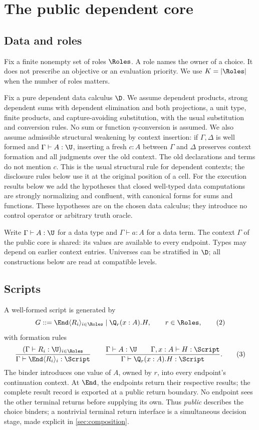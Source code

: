 \section{The public dependent core}
\label{sec:core}

\subsection{Data and roles}

Fix a finite nonempty set of roles $\Roles$. A role names the owner of a
choice. It does not prescribe an objective or an evaluation priority. We use
$K=|\Roles|$ when the number of roles matters.

Fix a pure dependent data calculus $\D$. We assume dependent products, strong
dependent sums with dependent elimination and both projections, a unit type,
finite products, and capture-avoiding substitution, with the usual
substitution and conversion rules. No sum or function $\eta$-conversion is
assumed. We also assume admissible structural weakening by context insertion:
if $\Gamma,\Delta$ is well formed and $\Gamma\vdash A:\U$, inserting a
fresh $c:A$ between $\Gamma$ and $\Delta$ preserves context formation and
all judgments over the old context. The old declarations and terms do not
mention $c$. This is the usual structural rule for dependent contexts;
the disclosure rules below use it at the original position of a cell.
For the execution results below we
add the hypotheses that closed well-typed data computations are strongly
normalizing and confluent, with canonical forms for sums and functions.
These hypotheses are on the chosen data calculus; they introduce no control
operator or arbitrary truth oracle.

Write $\Gamma\vdash A:\U$ for a data type and $\Gamma\vdash a:A$ for a data
term. The context $\Gamma$ of the public core is shared: its values are
available to every endpoint. Types may depend on earlier context entries.
Universes can be stratified in $\D$; all constructions below are read at
compatible levels.

\subsection{Scripts}

\begin{definition}
A well-formed script is generated by
\[
 G ::= \End\langle R_i\rangle_{i\in\Roles}
       \mid \Q_r(x:A).H,
 \qquad r\in\Roles,
 \tag{2}
\]
with formation rules
\[
 \frac{(\Gamma\vdash R_i:\U)_{i\in\Roles}}
      {\Gamma\vdash\End\langle R_i\rangle_i:\Script}
 \qquad
 \frac{\Gamma\vdash A:\U\qquad\Gamma,x:A\vdash H:\Script}
      {\Gamma\vdash\Q_r(x:A).H:\Script}.
 \tag{3}
\]
The binder introduces one value of $A$, owned by $r$, into every endpoint's
continuation context. At $\End$, the endpoints return their respective results;
the complete result record is exported at a public return boundary.
No endpoint sees the other terminal returns before supplying its own.
Thus \emph{public} describes the choice binders; a nontrivial terminal return
interface is a simultaneous decision stage, made explicit in
\cref{sec:composition}.
\end{definition}


